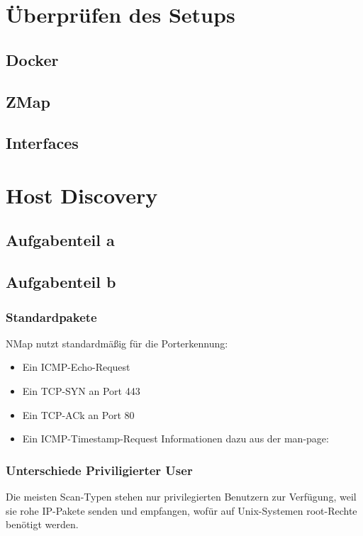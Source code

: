 \documentclass[a4paper,12pt,
headsepline,           %
twoside,               %
pointlessnumbers,      %
bibtotoc,              %
BCOR15mm               %
]{scrbook}
\begin{document}
\section*{Überprüfen des Setups}

\subsection*{Docker}


\subsection*{ZMap}


\subsection*{Interfaces}


\section*{Host Discovery}
\subsection*{Aufgabenteil a}


\subsection*{Aufgabenteil b}
\subsubsection*{Standardpakete}
NMap nutzt standardmäßig für die Porterkennung:
\begin{itemize}
  \item Ein ICMP-Echo-Request
  \item Ein TCP-SYN an Port 443
  \item Ein TCP-ACk an Port 80
  \item Ein ICMP-Timestamp-Request Informationen dazu aus der man-page:
\end{itemize}

\subsubsection*{Unterschiede Priviligierter User}
Die meisten Scan-Typen stehen nur privilegierten Benutzern zur Verfügung, weil sie rohe IP-Pakete senden und empfangen, wofür auf Unix-Systemen root-Rechte benötigt werden. 
\end{document}
